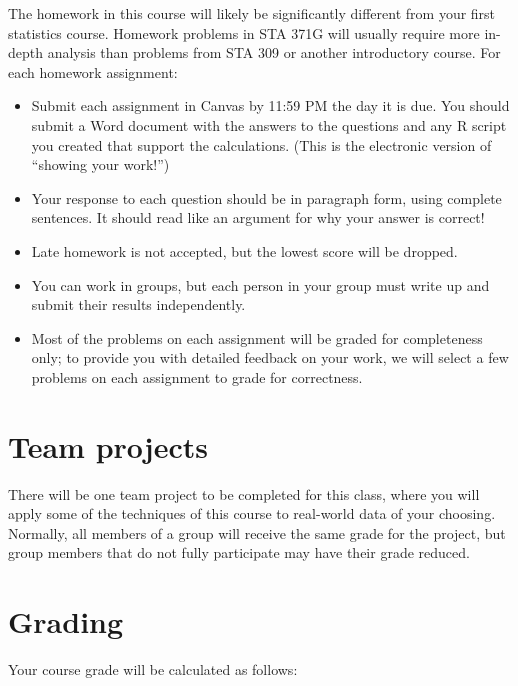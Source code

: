 \documentclass[12pt]{article}
\begin{document}
The homework in this course will likely be significantly different from your first statistics course.  Homework problems in STA 371G will usually require more in-depth analysis than problems from STA 309 or another introductory course.  For each homework assignment:
\begin{itemize}
\item Submit each assignment in Canvas by 11:59 PM the day it is due.  You should submit a Word document with the answers to the questions and any R script you created that support the calculations.  (This is the electronic version of ``showing your work!'')
\item Your response to each question should be in paragraph form, using complete sentences.  It should read like an argument for why your answer is correct!
\item Late homework is not accepted, but the lowest score will be dropped.  
\item You can work in groups, but each person in your group must write up and submit their results independently.
\item Most of the problems on each assignment will be graded for completeness only; to provide you with detailed feedback on your work, we will select a few problems on each assignment to grade for correctness.
\end{itemize}

\section*{Team projects}

There will be one team project to be completed for this class, where you will apply some of the techniques of this course to real-world data of your choosing.  Normally, all members of a group will receive the same grade for the project, but group members that do not fully participate may have their grade reduced.  

\section*{Grading}

Your course grade will be calculated as follows:
\end{document}
